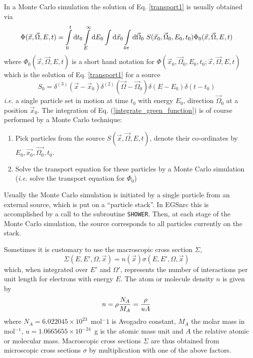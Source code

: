 In a Monte Carlo simulation the solution of Eq. \eqref{transport1}
is usually obtained via
\begin{equation}
\label{integrate_green_function}
\Phi(\vec{x},\vec{\Omega},E,t) = \int\limits_0^t {\rm d}t_0
\int\limits_E^\infty {\rm d}E_0 \int {\rm d}\vec{x}_0 \int\limits_{4 \pi}
{\rm d}\vec{\Omega}_0~ S(\vec{x}_0,\vec{\Omega}_0,E_0,t_0)
\Phi_0(\vec{x},\vec{\Omega},E,t)
\end{equation}
where $\Phi_0(\vec{x},\vec{\Omega},E,t)$ is a short hand notation
for $\Phi(\vec{x}_0,\vec{\Omega}_0,E_0,t_0;\vec{x},\vec{\Omega},E,t)$
which is the solution of
Eq. \eqref{transport1} for a source
\begin{equation}
S_0 = \delta^{(3)}(\vec{x} - \vec{x}_0) \delta^{(2)} (\vec{\Omega} -
\vec{\Omega}_0) \delta(E-E_0) \delta(t - t_0)
\end{equation}
{\em i.e.} a single particle set in motion at time $t_0$ with
energy $E_0$, direction $\vec{\Omega}_0$ at a position $\vec{x}_0$.
The integration of Eq. (\eqref{integrate_green_function})
is of course performed by a Monte Carlo technique:
\begin{enumerate}
\item
Pick particles from the source $S(\vec{x},\vec{\Omega},E,t)$,
denote their co-ordinates by $E_0, \vec{x_0}, \vec{\Omega_0}, t_0$.
\item
Solve the transport equation for these particles by a Monte Carlo
simulation ({\em i.e.} solve the transport equation for
$\Phi_0$)
\end{enumerate}
Usually the Monte Carlo simulation is initiated by a single
particle from an external source, which is put on a ``particle
stack''. In EGSnrc this is accomplished by a call to the subroutine
{\tt SHOWER}. Then, at each stage of the Monte Carlo simulation,
the source corresponds to all particles currently on the stack.

Sometimes it is customary to use the macroscopic cross section $\Sigma$,
\begin{equation}
\Sigma(E,E',\Omega,\vec{x}) = n(\vec{x}) \sigma(E,E',\Omega,\vec{x})
\end{equation}
which, when integrated over $E'$ and $\Omega'$, represents the number of
interactions per unit length for electrons with energy $E$.
The atom or molecule density $n$ is given by
\begin{equation}
n = \rho \frac{N_A}{M_A} = {\rho \over u A}
\end{equation}
where $N_A = 6.022045\times10^{23}$~mol$^-1$ is
Avogadro constant, $M_A$ the molar mass in mol$^{-1}$,
$u = 1.0665655\times10^{-24}$~g is the atomic mass unit
and $A$ the relative atomic or molecular mass. Macroscopic
cross sections $\Sigma$ are thus obtained from microscopic
cross sections $\sigma$ by multiplication with one of
the above factors.

